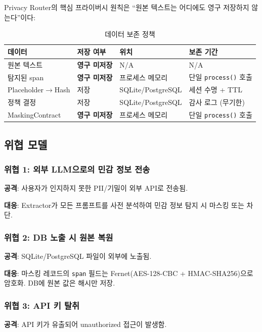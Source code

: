 \documentclass[11pt,a4paper]{article}
\begin{document}
Privacy Router의 핵심 프라이버시 원칙은 ``원본 텍스트는 어디에도 영구 저장하지 않는다''이다:

\begin{table}[h]
\centering
\begin{tabular}{@{}llll@{}}
\toprule
데이터 & 저장 여부 & 위치 & 보존 기간 \\
\midrule
원본 텍스트 & \textbf{영구 미저장} & N/A & N/A \\
탐지된 span & \textbf{영구 미저장} & 프로세스 메모리 & 단일 \texttt{process()} 호출 \\
Placeholder$\rightarrow$Hash & 저장 & SQLite/PostgreSQL & 세션 수명 + TTL \\
정책 결정 & 저장 & SQLite/PostgreSQL & 감사 로그 (무기한) \\
MaskingContract & \textbf{영구 미저장} & 프로세스 메모리 & 단일 \texttt{process()} 호출 \\
\bottomrule
\end{tabular}
\caption{데이터 보존 정책}
\end{table}

\subsection{위협 모델}

\subsubsection{위협 1: 외부 LLM으로의 민감 정보 전송}

\textbf{공격}: 사용자가 인지하지 못한 PII/기밀이 외부 API로 전송됨.

\textbf{대응}: Extractor가 모든 프롬프트를 사전 분석하여 민감 정보 탐지 시 마스킹 또는 차단.

\subsubsection{위협 2: DB 노출 시 원본 복원}

\textbf{공격}: SQLite/PostgreSQL 파일이 외부에 노출됨.

\textbf{대응}: 마스킹 레코드의 \texttt{span} 필드는 Fernet(AES-128-CBC + HMAC-SHA256)으로 암호화. DB에 원본 값은 해시만 저장.

\subsubsection{위협 3: API 키 탈취}

\textbf{공격}: API 키가 유출되어 unauthorized 접근이 발생함.
\end{document}
